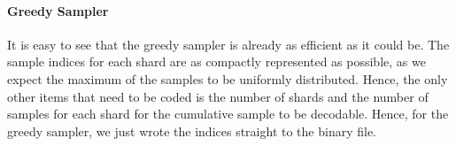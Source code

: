 \paragraph{Greedy Sampler} It is easy to see that the greedy sampler is already
as efficient as it could be. The sample indices for each shard are as compactly
represented as possible, as we expect the maximum of the samples to be uniformly
distributed. Hence, the only other items that need to be coded is the number
of shards and the number of samples for each shard for the cumulative sample to
be decodable. Hence, for the greedy sampler, we just wrote the indices straight
to the binary file.
